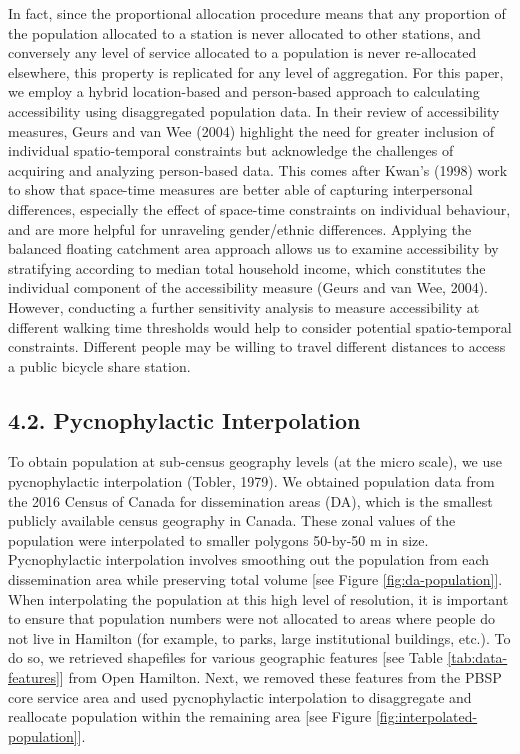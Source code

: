 \documentclass[]{elsarticle} %
\begin{document}
In fact, since the proportional allocation procedure means that any
proportion of the population allocated to a station is never allocated
to other stations, and conversely any level of service allocated to a
population is never re-allocated elsewhere, this property is replicated
for any level of aggregation. For this paper, we employ a hybrid
location-based and person-based approach to calculating accessibility
using disaggregated population data. In their review of accessibility
measures, Geurs and van Wee (2004) highlight the need for greater
inclusion of individual spatio-temporal constraints but acknowledge the
challenges of acquiring and analyzing person-based data. This comes
after Kwan's (1998) work to show that space-time measures are better
able of capturing interpersonal differences, especially the effect of
space-time constraints on individual behaviour, and are more helpful for
unraveling gender/ethnic differences. Applying the balanced floating
catchment area approach allows us to examine accessibility by
stratifying according to median total household income, which
constitutes the individual component of the accessibility measure (Geurs
and van Wee, 2004). However, conducting a further sensitivity analysis
to measure accessibility at different walking time thresholds would help
to consider potential spatio-temporal constraints. Different people may
be willing to travel different distances to access a public bicycle
share station.

\hypertarget{pycnophylactic-interpolation}{%
\subsection{4.2. Pycnophylactic
Interpolation}\label{pycnophylactic-interpolation}}

To obtain population at sub-census geography levels (at the micro
scale), we use pycnophylactic interpolation (Tobler, 1979). We obtained
population data from the 2016 Census of Canada for dissemination areas
(DA), which is the smallest publicly available census geography in
Canada. These zonal values of the population were interpolated to
smaller polygons 50-by-50 m in size. Pycnophylactic interpolation
involves smoothing out the population from each dissemination area while
preserving total volume {[}see Figure \ref{fig:da-population}{]}. When
interpolating the population at this high level of resolution, it is
important to ensure that population numbers were not allocated to areas
where people do not live in Hamilton (for example, to parks, large
institutional buildings, etc.). To do so, we retrieved shapefiles for
various geographic features {[}see Table \ref{tab:data-features}{]} from
Open Hamilton. Next, we removed these features from the PBSP core
service area and used pycnophylactic interpolation to disaggregate and
reallocate population within the remaining area {[}see Figure
\ref{fig:interpolated-population}{]}.
\end{document}
